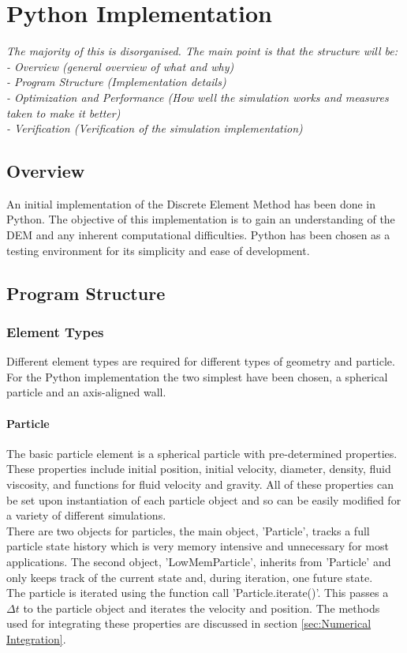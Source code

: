\documentclass[10pt,a4paper,titlepage]{report}
\begin{document}
\chapter{Python Implementation}
\textit{The majority of this is disorganised. The main point is that the structure will be:
\\- Overview (general overview of what and why)
\\- Program Structure (Implementation details)
\\- Optimization and Performance (How well the simulation works and measures taken to make it better)
\\- Verification (Verification of the simulation implementation)}
\label{ch:Python Implementation}
\section{Overview}
An initial implementation of the Discrete Element Method has been done in Python. The objective of this implementation is to gain an understanding of the DEM and any inherent computational difficulties. Python has been chosen as a testing environment for its simplicity and ease of development. 
\section{Program Structure}
\subsection{Element Types}
Different element types are required for different types of geometry and particle. For the Python implementation the two simplest have been chosen, a spherical particle and an axis-aligned wall.
\subsubsection{Particle}
The basic particle element is a spherical particle with pre-determined properties. These properties include initial position, initial velocity, diameter, density, fluid viscosity, and functions for fluid velocity and gravity. All of these properties can be set upon instantiation of each particle object and so can be easily modified for a variety of different simulations.
\\There are two objects for particles, the main object, 'Particle', tracks a full particle state history which is very memory intensive and unnecessary for most applications. The second object, 'LowMemParticle', inherits from 'Particle' and only keeps track of the current state and, during iteration, one future state.
\\The particle is iterated using the function call 'Particle.iterate()'. This passes a $\Delta t$ to the particle object and iterates the velocity and position. The methods used for integrating these properties are discussed in section \ref{sec:Numerical Integration}.
\end{document}

